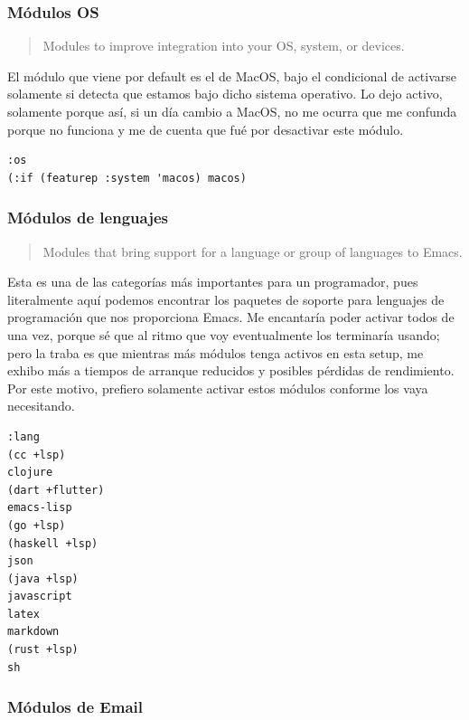 \documentclass[11pt]{article}
\begin{document}
\subsubsection{Módulos OS}
\label{sec:org5229355}

\begin{quote}
Modules to improve integration into your OS, system, or devices.
\end{quote}

El módulo que viene por default es el de MacOS, bajo el condicional de activarse solamente si detecta que estamos bajo dicho sistema operativo. Lo dejo activo, solamente porque así, si un día cambio a MacOS, no me ocurra que me confunda porque no funciona y me de cuenta que fué por desactivar este módulo.

\begin{verbatim}
:os
(:if (featurep :system 'macos) macos)

\end{verbatim}
\subsubsection{Módulos de lenguajes}
\label{sec:orge444aee}

\begin{quote}
Modules that bring support for a language or group of languages to Emacs.
\end{quote}

Esta es una de las categorías más importantes para un programador, pues literalmente aquí podemos encontrar los paquetes de soporte para lenguajes de programación que nos proporciona Emacs. Me encantaría poder activar todos de una vez, porque sé que al ritmo que voy eventualmente los terminaría usando; pero la traba es que mientras más módulos tenga activos en esta setup, me exhibo más a tiempos de arranque reducidos y posibles pérdidas de rendimiento. Por este motivo, prefiero solamente activar estos módulos conforme los vaya necesitando.

\begin{verbatim}
:lang
(cc +lsp)
clojure
(dart +flutter)
emacs-lisp
(go +lsp)
(haskell +lsp)
json
(java +lsp)
javascript
latex
markdown
(rust +lsp)
sh

\end{verbatim}
\subsubsection{Módulos de Email}
\label{sec:orgf25ce58}
\end{document}

